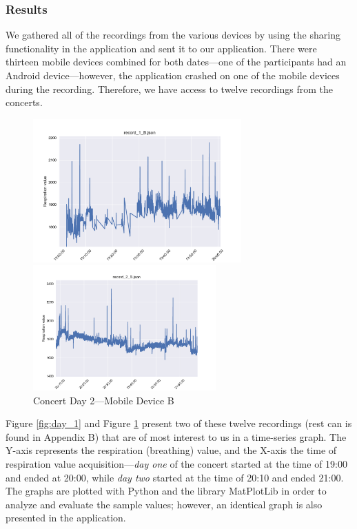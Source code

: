 \subsubsection{Results}

We gathered all of the recordings from the various devices by using the sharing functionality in the application and sent it to our application. There were thirteen mobile devices combined for both dates---one of the participants had an Android device---however, the application crashed on one of the mobile devices during the recording. Therefore, we have access to twelve recordings from the concerts. 

\begin{figure}
\parbox{7cm}{
\includegraphics[width=8cm]{images/Record_1_B.pdf}
\caption{Concert Day 1---Mobile Device B}
\label{fig:day_1}}
\qquad
\begin{minipage}{6cm}
\includegraphics[width=7cm]{images/Record_2_B.pdf}
\caption{Concert Day 2---Mobile Device B}
\label{fig:day_2}
\end{minipage}
\end{figure}

Figure \ref{fig:day_1} and Figure \ref{fig:day_2} present two of these twelve recordings (rest can is found in Appendix B) that are of most interest to us in a time-series graph. The Y-axis represents the respiration (breathing) value, and the X-axis the time of respiration value acquisition---\textit{day one} of the concert started at the time of 19:00 and ended at 20:00, while \textit{day two} started at the time of 20:10 and ended 21:00. The graphs are plotted with Python and the library MatPlotLib in order to analyze and evaluate the sample values; however, an identical graph is also presented in the application.

